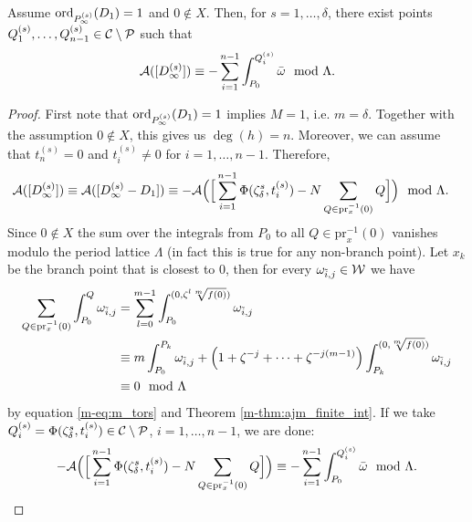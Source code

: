 \documentclass[main.tex]{subfiles}
\begin{document}
  \begin{thm}\label{thm:ajm_inf_ord1}
    Assume $\operatorname{ord}_{P_{\infty}^{(s)}}(D_1) = 1$ and $0 \not\in X$. Then, for $s = 1,\dots,\delta$, there exist points $Q_1^{(s)},\dots,Q_{n-1}^{(s)} \in \mathcal{C} \setminus \mathcal{P}$ such that
    \begin{equation}\label{eq:ajm_inf_ord1}
       \mathcal{A}( [D_{\infty}^{(s)}] ) \equiv -\sum_{i = 1}^{n-1} \int_{P_0}^{Q_i^{(s)}} \bar{\omega} \mod \Lambda.
    \end{equation}
  \end{thm}
  \begin{proof}
    First note that $\operatorname{ord}_{P_{\infty}^{(s)}}(D_1) = 1$ implies $M = 1$, i.e. $m = \delta$. Together with the assumption
    $0 \not\in X$, this gives us $\deg(h) = n$.
    Moreover, we can assume that $t_n^{(s)} = 0$ and $t_i^{(s)} \ne 0$ for $i=1,\dots,n-1$.
    Therefore,
    \begin{align*}
      \mathcal{A}( [D_{\infty}^{(s)}] )  & \equiv  \mathcal{A}([D_{\infty}^{(s)} - D_1])
      \equiv  -\mathcal{A} \Big( \Big[ \sum_{i = 1}^{n-1} \Phi(\zeta_{\delta}^s,t_i^{(s)}) - N \sum_{Q \in\text{pr}_x^{-1}(0)} Q  \Big] \Big)
       \mod \Lambda.
    \end{align*}
    Since  $0 \not\in X$ the sum over the integrals from $P_0$ to all $Q \in\text{pr}_x^{-1}(0)$ vanishes modulo the period lattice $\Lambda$ (in fact this is true for any non-branch point).
    Let $x_k$ be the branch point that is closest to $0$, then for every $\omega_{\tilde{i},j} \in \mathcal{W}$ we have
    \begin{align*}
    \sum_{Q \in\text{pr}_x^{-1}(0)} \int_{P_0}^Q \omega_{\tilde{i},j} & =  \sum_{l=0}^{m-1} \int_{P_0}^{(0,\zeta^l \sqrt[m]{f(0)})} \omega_{\tilde{i},j} \\
    & \equiv m \int_{P_0}^{P_k} \omega_{\tilde{i},j} + \left(1 + \zeta^{-j} + \dots + \zeta^{-j(m-1)}\right) \int_{P_k}^{(0,\sqrt[m]{f(0)})} \omega_{\tilde{i},j} \\
    & \equiv 0 \mod \Lambda
    \end{align*}
    by equation \eqref{m-eq:m_tors} and Theorem \ref{m-thm:ajm_finite_int}.
    If we take $Q_i^{(s)} = \Phi(\zeta_{\delta}^s,t_i^{(s)}) \in \mathcal{C} \setminus \mathcal{P}$, $i = 1,\dots,n-1$, we are done:
    \begin{align*}
    -\mathcal{A}  \Big( \Big[ \sum_{i = 1}^{n-1} \Phi(\zeta_{\delta}^s,t_i^{(s)}) - N \sum_{Q \in\text{pr}_x^{-1}(0)} Q \Big] \Big) \equiv
    -\sum_{i = 1}^{n-1} \int_{P_0}^{Q_i^{(s)}} \bar{\omega} \mod \Lambda.
    \end{align*}
     \end{proof}
\end{document}
